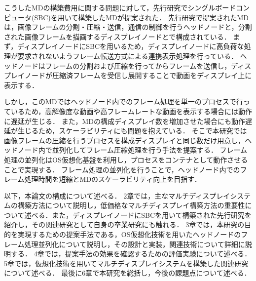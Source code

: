 こうしたMDの構築費用に関する問題に対して，先行研究でシングルボードコンピュータ(SBC)を用いて構築したMDが提案された．
先行研究で提案されたMDは，画像フレームの分割・圧縮・送信，通信の制御を行うヘッドノードと，分割された画像フレームを描画するディスプレイノードとで構成されている．
まず，ディスプレイノードにSBCを用いるため，ディスプレイノードに高負荷な処理が要求されないようフレーム転送方式による連携表示処理を行っている．
ヘッドノードはフレームの分割および圧縮を行ってからフレームを送信し，ディスプレイノードが圧縮済フレームを受信し展開することで動画をディスプレイ上に表示する．

しかし，このMDではヘッドノード内でのフレーム処理を単一のプロセスで行っているため，高解像度な動画や高フレームレートな動画を表示する場合には動作に遅延が生じる．
また，MDの構成ディスプレイ数を増加させた場合にも動作遅延が生じるため，スケーラビリティにも問題を抱えている．
そこで本研究では画像フレームの圧縮を行うプロセスを構成ディスプレイと同じ数だけ用意し，ヘッドノード内で並列化してフレーム圧縮処理を行う手法を提案する．
フレーム処理の並列化はOS仮想化基盤を利用し，プロセスをコンテナとして動作させることで実現する．
フレーム処理の並列化を行うことで，ヘッドノード内でのフレーム処理時間を短縮とMDのスケーラビリティ向上を目指す．

以下，本論文の構成について述べる．
2章では，主なマルチディスプレイシステムの構築方法について説明し，低価格なマルチディスプレイ構築方法の重要性について述べる．また，ディスプレイノードにSBCを用いて構築された先行研究を紹介し，その関連研究として自身の卒業研究にも触れる．
3章では，本研究の目的を実現するための提案手法である，OS仮想化技術を用いたヘッドノードのフレーム処理並列化について説明し，その設計と実装，関連技術について詳細に説明する．
4章では，提案手法の効果を確認するための評価実験について述べる．
5章では，仮想化技術を用いてマルチディスプレイシステムを構築した関連研究について述べる．
最後に6章で本研究を総括し，今後の課題点について述べる．